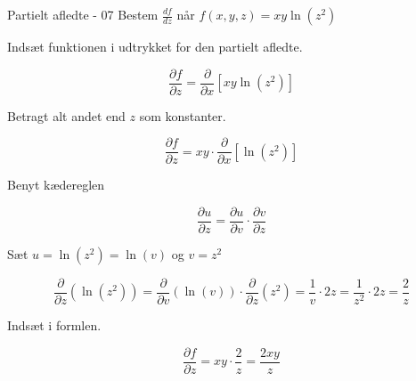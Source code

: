 \documentclass{article}
\begin{document}
\begin{exercise}{Partielt afledte - 07}
	Bestem $\frac{df}{dz}$ når $f(x,y,z) = xy \ln(z^2)$ 
	
	
	\hint
	Indsæt funktionen i udtrykket for den partielt afledte.
	
	\hint
	
	\[
	\frac{\partial f}{\partial z} = \frac{\partial }{\partial x} \left[ xy \ln(z^2) \right]
	\]
	
	\hint
	
	Betragt alt andet end $z$ som konstanter.
	
	\hint
	\[
	\frac{\partial f}{\partial z} = xy \cdot \frac{\partial }{\partial x} \left[\ln(z^2) \right]
	\]

	\hint 
	Benyt kædereglen
	
	\hint
	\[
	\frac{\partial u}{\partial z} = \frac{\partial u}{\partial v} \cdot \frac{\partial v}{\partial z}
	\]
	
	\hint
	Sæt $u=\ln(z^2) = \ln(v)$ og $v = z^2$
		
	\hint
	\[
	\frac{\partial}{\partial z} \left( \ln(z^2)\right) = \frac{\partial}{\partial v} \left( \ln(v) \right) \cdot \frac{\partial}{\partial z} (z^2) = \frac{1}{v} \cdot 2z = \frac{1}{z^2} \cdot 2z = \frac{2}{z}
	\]
	
	\hint
	Indsæt i formlen.
	
	\hint
	\[
	\frac{\partial f}{\partial z} = xy \cdot \frac{2}{z} = \frac{2xy}{z}
	\]	
	
	
\end{exercise}

\newpage
\end{document}
